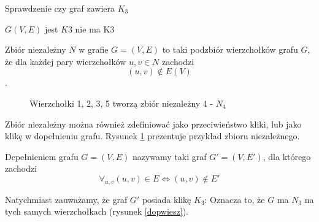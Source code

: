   
  \begin{algorithm}
    \caption{Sprawdzenie czy graf zawiera $K_3$}
    \begin{algorithmic}
    \REQUIRE $G(V, E) $
          \STATE \RETURN jest $K3$
        \ENDIF
      \ENDFOR
    \ENDFOR
    \STATE \RETURN nie ma K3
    \end{algorithmic}
  \end{algorithm}
  
  
  \begin{definition}
    Zbiór niezależny $N$ w grafie $G=(V,E)$ to taki podzbiór wierzchołków grafu $G$, że dla każdej pary wierzchołków $u, v \in N$ zachodzi $$(u, v) \notin E(V) $$. 
  \end{definition}

    \begin{figure}[H]
      \centering
        \caption{Wierzchołki 1, 2, 3, 5 tworzą zbiór niezależny 4 - $N_4$ }
        \label{zniez}
     \end{figure}


     Zbiór niezależny można również zdefiniować jako przeciwieństwo kliki, lub jako klikę w dopełnieniu grafu. Rysunek \ref{zniez} prezentuje przykład zbioru niezależnego.

    \begin{definition}
      Depełnieniem grafu $G=(V,E)$ nazywamy taki graf $G'=(V,E')$, 
      dla którego zachodzi 
      $$\forall_{u,v} (u,v) \in E \iff (u,v) \notin E'$$
    \end{definition}
  
     Natychmiast zauważamy, że graf $G'$ posiada klikę $K_3$:
    Oznacza to, że $G$ ma $N_3$ na tych samych wierzchołkach (rysunek \ref{dopwiesz}).

